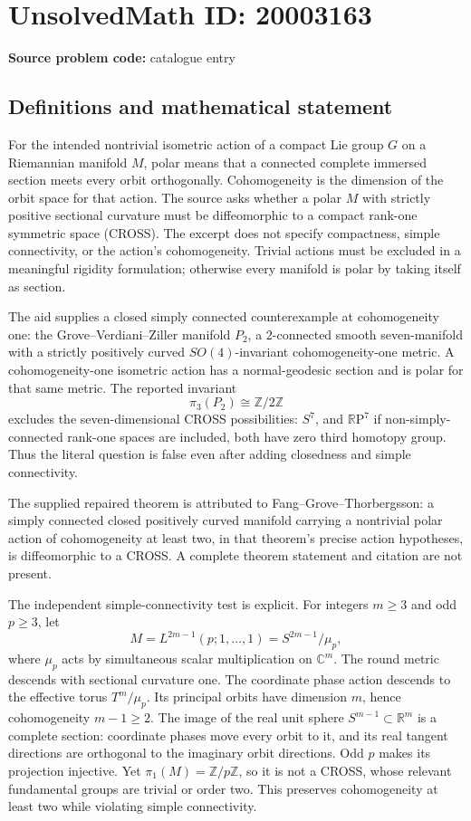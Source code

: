 \documentclass[11pt]{article}
\newcommand{\Z}{\mathbb{Z}}
\newcommand{\R}{\mathbb{R}}
\newcommand{\C}{\mathbb{C}}
\begin{document}
\section*{UnsolvedMath ID: 20003163}
\textbf{Source problem code:} catalogue entry
\subsection{Definitions and mathematical statement}
For the intended nontrivial isometric action of a compact Lie group $G$ on a Riemannian manifold $M$, polar means that a connected complete immersed section meets every orbit orthogonally. Cohomogeneity is the dimension of the orbit space for that action. The source asks whether a polar $M$ with strictly positive sectional curvature must be diffeomorphic to a compact rank-one symmetric space (CROSS). The excerpt does not specify compactness, simple connectivity, or the action's cohomogeneity. Trivial actions must be excluded in a meaningful rigidity formulation; otherwise every manifold is polar by taking itself as section.

The aid supplies a closed simply connected counterexample at cohomogeneity one: the Grove--Verdiani--Ziller manifold $P_2$, a $2$-connected smooth seven-manifold with a strictly positively curved $SO(4)$-invariant cohomogeneity-one metric. A cohomogeneity-one isometric action has a normal-geodesic section and is polar for that same metric. The reported invariant
\[
\pi_3(P_2)\cong\Z/2\Z
\]
excludes the seven-dimensional CROSS possibilities: $S^7$, and $\R\mathrm P^7$ if non-simply-connected rank-one spaces are included, both have zero third homotopy group. Thus the literal question is false even after adding closedness and simple connectivity.

The supplied repaired theorem is attributed to Fang--Grove--Thorbergsson: a simply connected closed positively curved manifold carrying a nontrivial polar action of cohomogeneity at least two, in that theorem's precise action hypotheses, is diffeomorphic to a CROSS. A complete theorem statement and citation are not present.

The independent simple-connectivity test is explicit. For integers $m\geq3$ and odd $p\geq3$, let
\[
M=L^{2m-1}(p;1,\ldots,1)=S^{2m-1}/\mu_p,
\]
where $\mu_p$ acts by simultaneous scalar multiplication on $\C^m$. The round metric descends with sectional curvature one. The coordinate phase action descends to the effective torus $T^m/\mu_p$. Its principal orbits have dimension $m$, hence cohomogeneity $m-1\geq2$. The image of the real unit sphere $S^{m-1}\subset\R^m$ is a complete section: coordinate phases move every orbit to it, and its real tangent directions are orthogonal to the imaginary orbit directions. Odd $p$ makes its projection injective. Yet $\pi_1(M)=\Z/p\Z$, so it is not a CROSS, whose relevant fundamental groups are trivial or order two. This preserves cohomogeneity at least two while violating simple connectivity.
\end{document}
